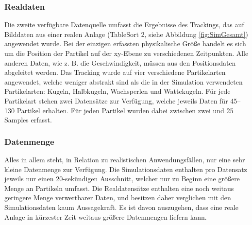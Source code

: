 \subsubsection{Realdaten}

Die zweite verfügbare Datenquelle umfasst die Ergebnisse des Trackings, das auf Bilddaten aus einer realen Anlage (TableSort 2, siehe Abbildung \ref{fig:SimGesamt}) angewendet wurde. Bei der einzigen erfassten physikalische Größe handelt es sich um die Position der Partikel auf der xy-Ebene zu verschiedenen Zeitpunkten. Alle anderen Daten, wie z. B. die Geschwindigkeit, müssen aus den Positionsdaten abgeleitet werden. Das Tracking wurde auf vier verschiedene Partikelarten angewendet, welche weniger abstrakt sind als die in der Simulation verwendeten Partikelarten: Kugeln, Halbkugeln, Wachsperlen und Wattekugeln. Für jede Partikelart stehen zwei Datensätze zur Verfügung, welche jeweils Daten für 45--130 Partikel erhalten. Für jeden Partikel wurden dabei zwischen zwei und 25 Samples erfasst.

\subsubsection{Datenmenge}

Alles in allem steht, in Relation zu realistischen Anwendungsfällen, nur eine sehr kleine Datenmenge zur Verfügung. Die Simulationsdaten enthalten pro Datensatz jeweils nur einen 20-sekündigen Ausschnitt, welcher nur zu Beginn eine größere Menge an Partikeln umfasst. Die Realdatensätze enthalten eine noch weitaus geringere Menge verwertbarer Daten, und besitzen daher verglichen mit den Simulationsdaten kaum Aussagekraft. Es ist davon auszugehen, dass eine reale Anlage in kürzester Zeit weitaus größere Datenmengen liefern kann.

